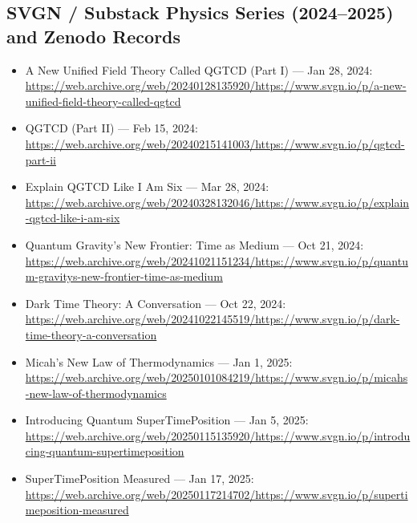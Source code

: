 \documentclass[american,11pt,letterpaper]{article}
\def\emph#1{#1}%
\begin{document}
\subsection{SVGN / Substack Physics Series (2024--2025) and Zenodo Records}
\begin{itemize}
  \item \emph{A New Unified Field Theory Called QGTCD (Part I)} --- Jan 28, 2024: \url{https://web.archive.org/web/20240128135920/https://www.svgn.io/p/a-new-unified-field-theory-called-qgtcd}
  \item \emph{QGTCD (Part II)} --- Feb 15, 2024: \url{https://web.archive.org/web/20240215141003/https://www.svgn.io/p/qgtcd-part-ii}
  \item \emph{Explain QGTCD Like I Am Six} --- Mar 28, 2024: \url{https://web.archive.org/web/20240328132046/https://www.svgn.io/p/explain-qgtcd-like-i-am-six}
  \item \emph{Quantum Gravity's New Frontier: Time as Medium} --- Oct 21, 2024: \url{https://web.archive.org/web/20241021151234/https://www.svgn.io/p/quantum-gravitys-new-frontier-time-as-medium}
  \item \emph{Dark Time Theory: A Conversation} --- Oct 22, 2024: \url{https://web.archive.org/web/20241022145519/https://www.svgn.io/p/dark-time-theory-a-conversation}
  \item \emph{Micah's New Law of Thermodynamics} --- Jan 1, 2025: \url{https://web.archive.org/web/20250101084219/https://www.svgn.io/p/micahs-new-law-of-thermodynamics}
  \item \emph{Introducing Quantum SuperTimePosition} --- Jan 5, 2025: \url{https://web.archive.org/web/20250115135920/https://www.svgn.io/p/introducing-quantum-supertimeposition}
  \item \emph{SuperTimePosition Measured} --- Jan 17, 2025: \url{https://web.archive.org/web/20250117214702/https://www.svgn.io/p/supertimeposition-measured}
\end{itemize}
\end{document}
